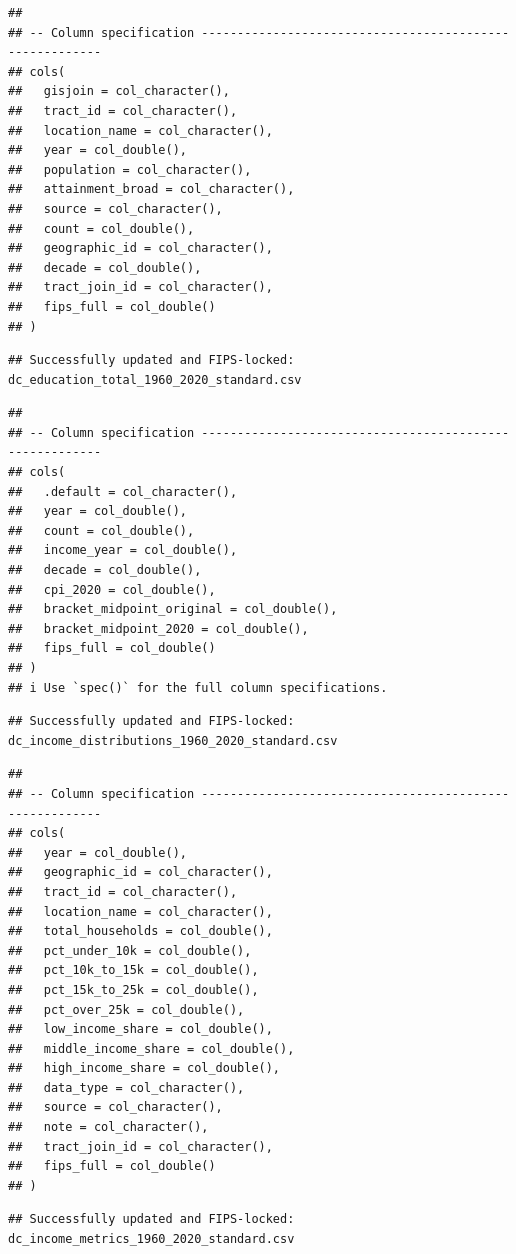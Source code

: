 \documentclass[
]{article}
\begin{document}
\begin{verbatim}
## 
## -- Column specification --------------------------------------------------------
## cols(
##   gisjoin = col_character(),
##   tract_id = col_character(),
##   location_name = col_character(),
##   year = col_double(),
##   population = col_character(),
##   attainment_broad = col_character(),
##   source = col_character(),
##   count = col_double(),
##   geographic_id = col_character(),
##   decade = col_double(),
##   tract_join_id = col_character(),
##   fips_full = col_double()
## )
\end{verbatim}

\begin{verbatim}
## Successfully updated and FIPS-locked: dc_education_total_1960_2020_standard.csv
\end{verbatim}

\begin{verbatim}
## 
## -- Column specification --------------------------------------------------------
## cols(
##   .default = col_character(),
##   year = col_double(),
##   count = col_double(),
##   income_year = col_double(),
##   decade = col_double(),
##   cpi_2020 = col_double(),
##   bracket_midpoint_original = col_double(),
##   bracket_midpoint_2020 = col_double(),
##   fips_full = col_double()
## )
## i Use `spec()` for the full column specifications.
\end{verbatim}

\begin{verbatim}
## Successfully updated and FIPS-locked: dc_income_distributions_1960_2020_standard.csv
\end{verbatim}

\begin{verbatim}
## 
## -- Column specification --------------------------------------------------------
## cols(
##   year = col_double(),
##   geographic_id = col_character(),
##   tract_id = col_character(),
##   location_name = col_character(),
##   total_households = col_double(),
##   pct_under_10k = col_double(),
##   pct_10k_to_15k = col_double(),
##   pct_15k_to_25k = col_double(),
##   pct_over_25k = col_double(),
##   low_income_share = col_double(),
##   middle_income_share = col_double(),
##   high_income_share = col_double(),
##   data_type = col_character(),
##   source = col_character(),
##   note = col_character(),
##   tract_join_id = col_character(),
##   fips_full = col_double()
## )
\end{verbatim}

\begin{verbatim}
## Successfully updated and FIPS-locked: dc_income_metrics_1960_2020_standard.csv
\end{verbatim}
\end{document}

